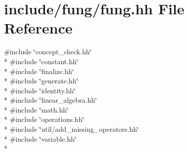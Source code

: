 \hypertarget{fung_8hh}{\section{include/fung/fung.hh File Reference}
\label{fung_8hh}
}
{\ttfamily \#include \char`\"{}concept\-\_\-check.\-hh\char`\"{}}\\*
{\ttfamily \#include \char`\"{}constant.\-hh\char`\"{}}\\*
{\ttfamily \#include \char`\"{}finalize.\-hh\char`\"{}}\\*
{\ttfamily \#include \char`\"{}generate.\-hh\char`\"{}}\\*
{\ttfamily \#include \char`\"{}identity.\-hh\char`\"{}}\\*
{\ttfamily \#include \char`\"{}linear\-\_\-algebra.\-hh\char`\"{}}\\*
{\ttfamily \#include \char`\"{}math.\-hh\char`\"{}}\\*
{\ttfamily \#include \char`\"{}operations.\-hh\char`\"{}}\\*
{\ttfamily \#include \char`\"{}util/add\-\_\-missing\-\_\-operators.\-hh\char`\"{}}\\*
{\ttfamily \#include \char`\"{}variable.\-hh\char`\"{}}\\*
